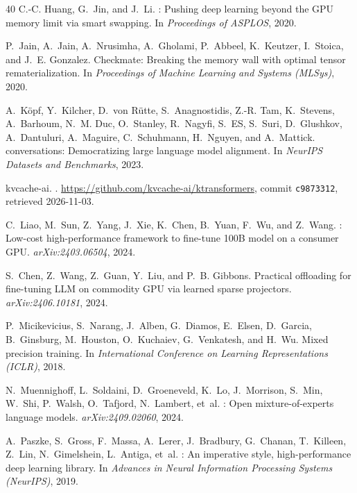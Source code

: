 \documentclass[11pt,letterpaper]{article}
\theoremstyle{definition}
\theoremstyle{plain}
\begin{document}
\begin{thebibliography}{40}
C.-C. Huang, G.~Jin, and J.~Li.
: Pushing deep learning beyond the {GPU} memory limit via smart swapping.
\newblock In \emph{Proceedings of ASPLOS}, 2020.

P.~Jain, A.~Jain, A.~Nrusimha, A.~Gholami, P.~Abbeel, K.~Keutzer, I.~Stoica, and J.~E. Gonzalez.
\newblock Checkmate: Breaking the memory wall with optimal tensor rematerialization.
\newblock In \emph{Proceedings of Machine Learning and Systems (MLSys)}, 2020.

A.~K\"opf, Y.~Kilcher, D.~von R\"utte, S.~Anagnostidis, Z.-R. Tam, K.~Stevens, A.~Barhoum, N.~M. Duc, O.~Stanley, R.~Nagyfi, S.~ES, S.~Suri, D.~Glushkov, A.~Dantuluri, A.~Maguire, C.~Schuhmann, H.~Nguyen, and A.~Mattick.
 conversations: Democratizing large language model alignment.
\newblock In \emph{NeurIPS Datasets and Benchmarks}, 2023.

kvcache-ai.
.
\newblock \url{https://github.com/kvcache-ai/ktransformers}, commit \texttt{c9873312}, retrieved 2026-11-03.

C.~Liao, M.~Sun, Z.~Yang, J.~Xie, K.~Chen, B.~Yuan, F.~Wu, and Z.~Wang.
: Low-cost high-performance framework to fine-tune 100{B} model on a consumer {GPU}.
\newblock \emph{arXiv:2403.06504}, 2024.

S.~Chen, Z.~Wang, Z.~Guan, Y.~Liu, and P.~B. Gibbons.
\newblock Practical offloading for fine-tuning {LLM} on commodity {GPU} via learned sparse projectors.
\newblock \emph{arXiv:2406.10181}, 2024.

P.~Micikevicius, S.~Narang, J.~Alben, G.~Diamos, E.~Elsen, D.~Garcia, B.~Ginsburg, M.~Houston, O.~Kuchaiev, G.~Venkatesh, and H.~Wu.
\newblock Mixed precision training.
\newblock In \emph{International Conference on Learning Representations (ICLR)}, 2018.

N.~Muennighoff, L.~Soldaini, D.~Groeneveld, K.~Lo, J.~Morrison, S.~Min, W.~Shi, P.~Walsh, O.~Tafjord, N.~Lambert, et~al.
: Open mixture-of-experts language models.
\newblock \emph{arXiv:2409.02060}, 2024.

A.~Paszke, S.~Gross, F.~Massa, A.~Lerer, J.~Bradbury, G.~Chanan, T.~Killeen, Z.~Lin, N.~Gimelshein, L.~Antiga, et~al.
: An imperative style, high-performance deep learning library.
\newblock In \emph{Advances in Neural Information Processing Systems (NeurIPS)}, 2019.


\end{thebibliography}
\end{document}
